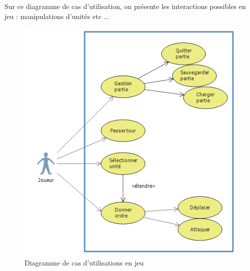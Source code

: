 Sur ce diagramme de cas d'utilisation, on présente les interactions possibles en jeu : manipulations d'unités etc ...
\begin{figure}
	\centering
		\includegraphics[width=\textwidth]{img/ucd_ig.png}
		 \caption{\label{étiquette} Diagramme de cas d'utilisations en jeu}
	\label{casdut2}
\end{figure}

